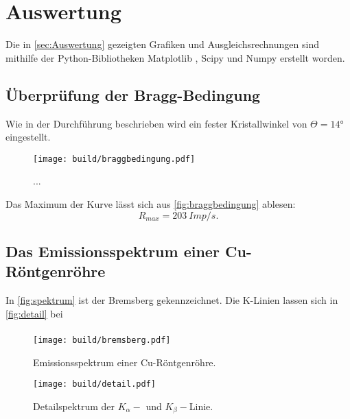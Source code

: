 \section{Auswertung}
\label{sec:Auswertung}

Die in \autoref{sec:Auswertung} gezeigten Grafiken und Ausgleichsrechnungen sind mithilfe der Python-Bibliotheken Matplotlib \cite{matplotlib}, Scipy \cite{scipy} und Numpy \cite{numpy}
erstellt worden.

\subsection{Überprüfung der Bragg-Bedingung}

Wie in der Durchführung beschrieben wird ein fester Kristallwinkel von $\Theta = 14°$
eingestellt. 
\begin{figure}[H]
  \texttt{[image: build/braggbedingung.pdf]}
  \caption{...}
  \label{fig:braggbedingung}
\end{figure} 
Das Maximum der Kurve lässt sich aus \autoref{fig:braggbedingung} ablesen:
\begin{equation}
  R_{max} = \SI{203}{Imp/s}.
\end{equation}

\subsection{Das Emissionsspektrum einer Cu-Röntgenröhre}
In \autoref{fig:spektrum} ist der Bremsberg gekennzeichnet. Die K-Linien lassen sich in \autoref{fig:detail} bei 
\begin{align}

\end{align}

\begin{figure}[H]
  \texttt{[image: build/bremsberg.pdf]}
  \caption{Emissionsspektrum einer Cu-Röntgenröhre.}
  \label{fig:spektrum}
\end{figure}

\begin{figure}[H]
  \texttt{[image: build/detail.pdf]}
  \caption{Detailspektrum der $K_{\alpha}-$ und $K_{\beta}-$Linie.}
  \label{fig:detail}
\end{figure}
